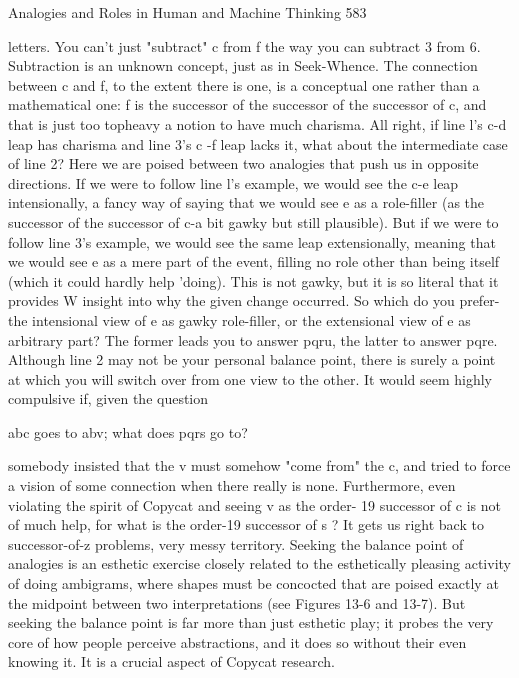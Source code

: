 Analogies and Roles in Human and Machine Thinking                                    583

letters. You can't just "subtract" c from f the way you can subtract 3 from 6.
Subtraction is an unknown concept, just as in Seek-Whence. The connection between
c and f, to the extent there is one, is a conceptual one rather than a mathematical one: f
is the successor of the successor of the successor of c, and that is just too topheavy a
notion to have much charisma.
        All right, if line l's c-d leap has charisma and line 3's c -f leap lacks it, what
about the intermediate case of line 2? Here we are poised between two analogies that
push us in opposite directions. If we were to follow line l's example, we would see the
c-e leap intensionally, a fancy way of saying that we would see e as a role-filler (as
the successor of the successor of c-a bit gawky but still plausible). But if we were to
follow line 3's example, we would see the same leap extensionally, meaning that we
would see e as a mere part of the event, filling no role other than being itself (which it
could hardly help 'doing). This is not gawky, but it is so literal that it provides W
insight into why the given change occurred. So which do you prefer-the intensional
view of e as gawky role-filler, or the extensional view of e as arbitrary part? The
former leads you to answer pqru, the latter to answer pqre.
        Although line 2 may not be your personal balance point, there is surely a point
at which you will switch over from one view to the other. It would seem highly
compulsive if, given the question

       abc goes to abv; what does pqrs go to?

somebody insisted that the v must somehow "come from" the c, and tried to force a
vision of some connection when there really is none. Furthermore, even violating the
spirit of Copycat and seeing v as the order- 19 successor of c is not of much help, for
what is the order-19 successor of s ? It gets us right back to successor-of-z problems,
very messy territory.
        Seeking the balance point of analogies is an esthetic exercise closely related to
the esthetically pleasing activity of doing ambigrams, where shapes must be
concocted that are poised exactly at the midpoint between two interpretations (see
Figures 13-6 and 13-7). But seeking the balance point is far more than just esthetic
play; it probes the very core of how people perceive abstractions, and it does so
without their even knowing it. It is a crucial aspect of Copycat research.

